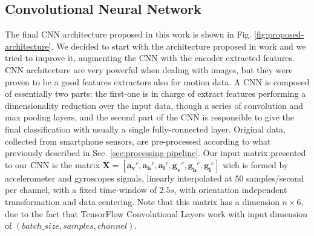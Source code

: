 \subsection{Convolutional Neural Network}
\label{subsec:cnn}
The final CNN architecture proposed in this work is shown in Fig. \ref{fig:proposed-architecture}. We decided to start with the architecture proposed in work \cite{ignatov2018real} and we tried to improve it, augmenting the CNN with the encoder extracted features. CNN architecture are very powerful when dealing with images, but they were proven to be a good features extractors also for motion data. A CNN is composed of essentially two parts: the first-one is in charge of extract features performing a dimensionality reduction over the input data, though a series of convolution and max pooling layers, and the second part of the CNN is responsible to give the final classification with usually a single fully-connected layer. Original data, collected from smartphone sensors, are pre-processed according to what previously described in Sec. \ref{sec:processing-pipeline}. Our input matrix presented to our CNN is the matrix \mbox{$ \boldsymbol{X} = [ \boldsymbol{a_{v}}^{c}, \boldsymbol{a_{h}}^{c}, \boldsymbol{a_{l}}^{c}, \boldsymbol{g_{v}}^{c}, \boldsymbol{g_{h}}^{c}, \boldsymbol{g_{l}}^{c}]$} wich is formed by accelerometer and gyroscopes signals, linearly interpolated at 50 samples/second per channel, with a fixed time-window of $2.5s$, with orientation independent transformation and data centering. Note that this matrix has a dimension $n \times 6$, due to the fact that TensorFlow Convolutional Layers work with input dimension of $(batch\_size, samples, channel)$.

